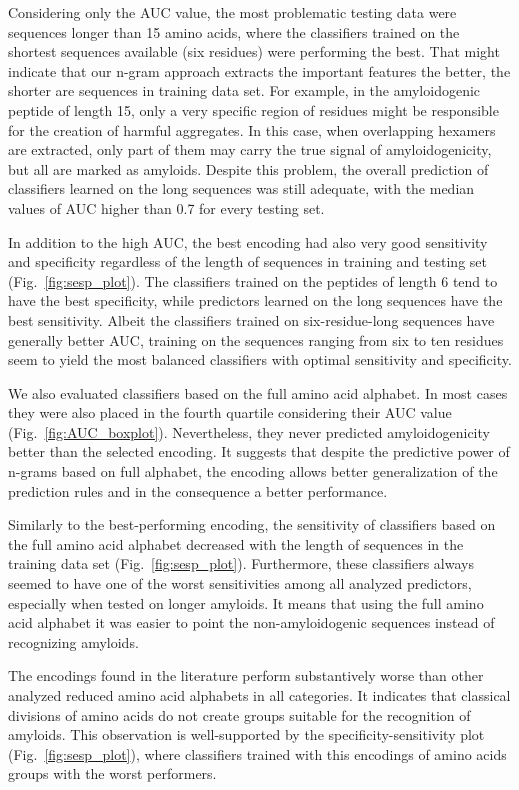 \documentclass[a4,center,fleqn]{NAR}
\begin{document}
  Considering only the AUC value, the most problematic testing data were 
sequences longer than 15 amino acids, where the classifiers trained on the 
shortest sequences available (six residues) were performing the best. That might 
indicate that our n-gram approach extracts the important features the better, 
the shorter are sequences in training data set. For example, in the 
amyloidogenic peptide of length 15, only a very specific region of residues 
might be responsible for the creation of harmful aggregates. In this case, when 
overlapping hexamers are extracted, only part of them may carry the true signal 
of amyloidogenicity, but all are marked as amyloids. Despite this problem, the 
overall prediction of classifiers learned on the long sequences was still 
adequate, with the median values of AUC higher than 0.7 for every testing set. 

  In addition to the high AUC, the best encoding had also very good sensitivity 
and specificity regardless of the length of sequences in training and testing 
set (Fig.~\ref{fig:sesp_plot}). The classifiers trained on the peptides of 
length 6 tend to have the best specificity, while predictors learned on the long 
sequences have the best sensitivity. Albeit the classifiers trained on 
six-residue-long sequences have generally better AUC, training on the sequences 
ranging from six to ten residues seem to yield the most balanced classifiers 
with optimal sensitivity and specificity.

  We also evaluated classifiers based on the full amino acid alphabet. In most 
cases they were also placed in the fourth quartile considering their AUC value 
(Fig.~\ref{fig:AUC_boxplot}). Nevertheless, they never predicted 
amyloidogenicity better than the selected encoding. It suggests that despite the 
predictive power of n-grams based on full alphabet, the encoding allows better 
generalization of the prediction rules and in the consequence a better 
performance.

  Similarly to the best-performing encoding, the sensitivity of classifiers 
based on the full amino acid alphabet decreased with the length of sequences in 
the training data set (Fig.~\ref{fig:sesp_plot}). Furthermore, these classifiers 
always seemed to  have one of the worst sensitivities among all analyzed 
predictors, especially when tested on longer amyloids. It means that using the 
full amino acid alphabet it was easier to point the non-amyloidogenic sequences 
instead of recognizing amyloids.

  The encodings found in the literature perform substantively worse than other 
analyzed reduced amino acid alphabets in all categories. It indicates that 
classical divisions of amino acids do not create groups suitable for the 
recognition of amyloids. This observation is well-supported by the 
specificity-sensitivity plot (Fig.~\ref{fig:sesp_plot}), where classifiers 
trained with this encodings of amino acids groups with the worst performers.
\end{document}
